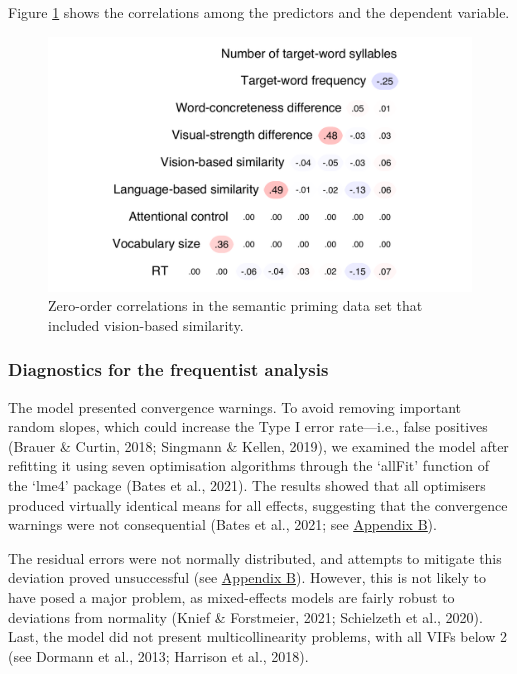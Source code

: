\documentclass[
  12pt,
  man,floatsintext]{apa7}
\begin{document}
Figure \ref{fig:semanticpriming-with-visualsimilarity-correlations} shows the correlations among the predictors and the dependent variable.

\begin{figure}

{\centering \includegraphics[width=0.73\linewidth]{thesis-core_files/figure-latex/semanticpriming-with-visualsimilarity-correlations-1} 

}

\caption{Zero-order correlations in the semantic priming data set that included vision-based similarity.}\label{fig:semanticpriming-with-visualsimilarity-correlations}
\end{figure}

\hypertarget{diagnostics-for-the-frequentist-analysis-1}{%
\subsubsection{Diagnostics for the frequentist analysis}\label{diagnostics-for-the-frequentist-analysis-1}}

The model presented convergence warnings. To avoid removing important random slopes, which could increase the Type I error rate---i.e., false positives (Brauer \& Curtin, 2018; Singmann \& Kellen, 2019), we examined the model after refitting it using seven optimisation algorithms through the `allFit' function of the `lme4' package (Bates et al., 2021). The results showed that all optimisers produced virtually identical means for all effects, suggesting that the convergence warnings were not consequential (Bates et al., 2021; see \protect\hyperlink{appendix-B-frequentist-analysis-diagnostics}{\underline{Appendix B}}).

The residual errors were not normally distributed, and attempts to mitigate this deviation proved unsuccessful (see \protect\hyperlink{appendix-B-frequentist-analysis-diagnostics}{\underline{Appendix B}}). However, this is not likely to have posed a major problem, as mixed-effects models are fairly robust to deviations from normality (Knief \& Forstmeier, 2021; Schielzeth et al., 2020). Last, the model did not present multicollinearity problems, with all VIFs below 2 (see Dormann et al., 2013; Harrison et al., 2018).
\end{document}
